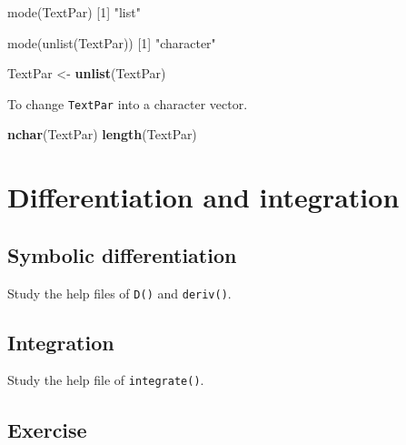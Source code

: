 \documentclass[
]{book}
\newenvironment{Shaded}{\begin{snugshade}}{\end{snugshade}}
\newcommand{\FunctionTok}[1]{\textcolor[rgb]{0.13,0.29,0.53}{\textbf{#1}}}
\newcommand{\NormalTok}[1]{#1}
\newcommand{\OtherTok}[1]{\textcolor[rgb]{0.56,0.35,0.01}{#1}}
\begin{document}
\begin{Shaded}
\begin{Highlighting}[]
\NormalTok{mode(TextPar)}
\NormalTok{[1] "list"}

\NormalTok{mode(unlist(TextPar))}
\NormalTok{[1] "character" }
\end{Highlighting}
\end{Shaded}

\begin{Shaded}
\begin{Highlighting}[]
\NormalTok{TextPar }\OtherTok{\textless{}{-}} \FunctionTok{unlist}\NormalTok{(TextPar)}
\end{Highlighting}
\end{Shaded}

To change \texttt{TextPar} into a character vector.

\begin{Shaded}
\begin{Highlighting}[]
\FunctionTok{nchar}\NormalTok{(TextPar)}
\FunctionTok{length}\NormalTok{(TextPar)}
\end{Highlighting}
\end{Shaded}

\section{Differentiation and integration}\label{differentiation-and-integration}

\subsection{Symbolic differentiation}\label{symbolic-differentiation}

Study the help files of \texttt{D()} and \texttt{deriv()}.

\subsection{Integration}\label{integration}

Study the help file of \texttt{integrate()}.

\subsection{Exercise}\label{exercise-8}
\end{document}
